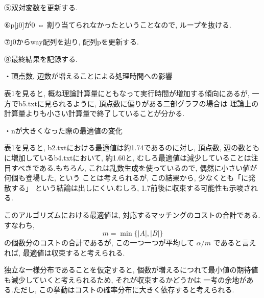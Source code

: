 \documentclass[a4paper]{ltjsarticle}
\begin{document}
⑤双対変数を更新する.

⑥p[j0]が0 ⇔ 割り当てられなかったということなので, ループを抜ける.

⑦j0からway配列を辿り, 配列pを更新する.

⑧最終結果を記録する.

・頂点数, 辺数が増えることによる処理時間への影響

表1を見ると, 概ね理論計算量にともなって実行時間が増加する傾向にあるが,
一方でb5.txtに見られるように, 頂点数に偏りがある二部グラフの場合は
理論上の計算量よりも小さい計算量で終了していることが分かる.

・nが大きくなった際の最適値の変化

表1を見ると, b2.txtにおける最適値は約1.74であるのに対し,
頂点数, 辺の数ともに増加しているb4.txtにおいて, 約1.60と,
むしろ最適値は減少していることは注目すべきである.もちろん,
これは乱数生成を使っているので, 偶然に小さい値が何個も登場した, という
ことは考えられるが, この結果から, 少なくとも「\infty に発散する」
という結論は出しにくい.むしろ, 1.7前後に収束する可能性も示唆される.

このアルゴリズムにおける最適値は, 対応するマッチングのコストの合計である.すなわち,
\[
m = \min\{|A|, |B|\}
\]
の個数分のコストの合計であるが,
この一つ一つが平均して $\alpha / m$ であると言えれば, 最適値は収束すると考えられる.

独立な一様分布であることを仮定すると,
個数が増えるにつれて最小値の期待値も減少していくと考えられるため, それが収束するかどうかは
一考の余地がある.ただし, この挙動はコストの確率分布に大きく依存すると考えられる.
\end{document}
